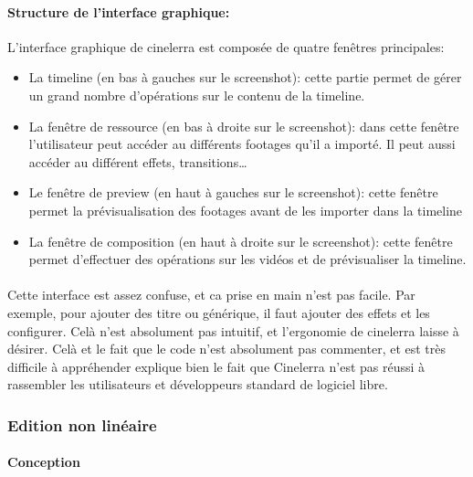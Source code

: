 \paragraph{Structure de l'interface graphique:}

L'interface graphique de cinelerra est composée de quatre fenêtres
principales:

\begin{itemize}
  \item {La timeline (en bas à gauches sur le screenshot): cette
    partie permet de gérer un grand nombre d'opérations sur le contenu
    de la timeline.}

  \item {La fenêtre de ressource (en bas à droite sur le screenshot):
    dans cette fenêtre l'utilisateur peut accéder au différents
    footages qu'il a importé. Il peut aussi accéder au différent
    effets, transitions\ldots}

  \item {Le fenêtre de preview (en haut à gauches sur le screenshot):
    cette fenêtre permet la prévisualisation des footages avant de
    les importer dans la timeline}

  \item {La fenêtre de composition (en haut à droite sur le screenshot):
    cette fenêtre permet d'effectuer des opérations sur les vidéos
    et de prévisualiser la timeline.}

\end{itemize}

\paragraph{}

Cette interface est assez confuse, et ca prise en main n'est pas facile.
Par exemple, pour ajouter des titre ou générique, il faut ajouter
des effets et les configurer. Celà n'est absolument pas intuitif, et
l'ergonomie de cinelerra laisse à désirer. Celà et le fait que le code
n'est absolument pas commenter, et est très difficile à appréhender
explique bien le fait que Cinelerra n'est pas réussi à rassembler les
utilisateurs et développeurs standard de logiciel libre.

\subsubsection{Edition non linéaire}

\paragraph{Conception}

